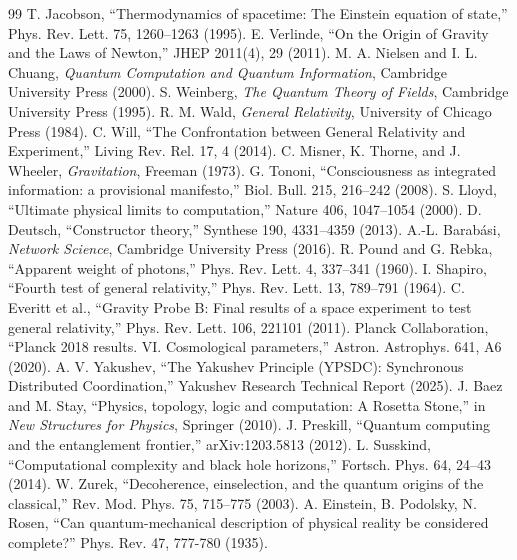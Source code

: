 \documentclass[11pt,a4paper]{article}
\begin{document}
\begin{thebibliography}{99}
 T. Jacobson, ``Thermodynamics of spacetime: The Einstein equation of state,'' Phys. Rev. Lett. 75, 1260–1263 (1995).
 E. Verlinde, ``On the Origin of Gravity and the Laws of Newton,'' JHEP 2011(4), 29 (2011).
 M. A. Nielsen and I. L. Chuang, \emph{Quantum Computation and Quantum Information}, Cambridge University Press (2000).
 S. Weinberg, \emph{The Quantum Theory of Fields}, Cambridge University Press (1995).
 R. M. Wald, \emph{General Relativity}, University of Chicago Press (1984).
 C. Will, ``The Confrontation between General Relativity and Experiment,'' Living Rev. Rel. 17, 4 (2014).
 C. Misner, K. Thorne, and J. Wheeler, \emph{Gravitation}, Freeman (1973).
 G. Tononi, ``Consciousness as integrated information: a provisional manifesto,'' Biol. Bull. 215, 216–242 (2008).
 S. Lloyd, ``Ultimate physical limits to computation,'' Nature 406, 1047–1054 (2000).
 D. Deutsch, ``Constructor theory,'' Synthese 190, 4331–4359 (2013).
 A.-L. Barabási, \emph{Network Science}, Cambridge University Press (2016).
 R. Pound and G. Rebka, ``Apparent weight of photons,'' Phys. Rev. Lett. 4, 337–341 (1960).
 I. Shapiro, ``Fourth test of general relativity,'' Phys. Rev. Lett. 13, 789–791 (1964).
 C. Everitt et al., ``Gravity Probe B: Final results of a space experiment to test general relativity,'' Phys. Rev. Lett. 106, 221101 (2011).
 Planck Collaboration, ``Planck 2018 results. VI. Cosmological parameters,'' Astron. Astrophys. 641, A6 (2020).
 A. V. Yakushev, ``The Yakushev Principle (YPSDC): Synchronous Distributed Coordination,'' Yakushev Research Technical Report (2025).
 J. Baez and M. Stay, ``Physics, topology, logic and computation: A Rosetta Stone,'' in \emph{New Structures for Physics}, Springer (2010).
 J. Preskill, ``Quantum computing and the entanglement frontier,'' arXiv:1203.5813 (2012).
 L. Susskind, ``Computational complexity and black hole horizons,'' Fortsch. Phys. 64, 24–43 (2014).
 W. Zurek, ``Decoherence, einselection, and the quantum origins of the classical,'' Rev. Mod. Phys. 75, 715–775 (2003).
 A. Einstein, B. Podolsky, N. Rosen, ``Can quantum-mechanical description of physical reality be considered complete?'' Phys. Rev. 47, 777-780 (1935).

\end{thebibliography}
\end{document}

